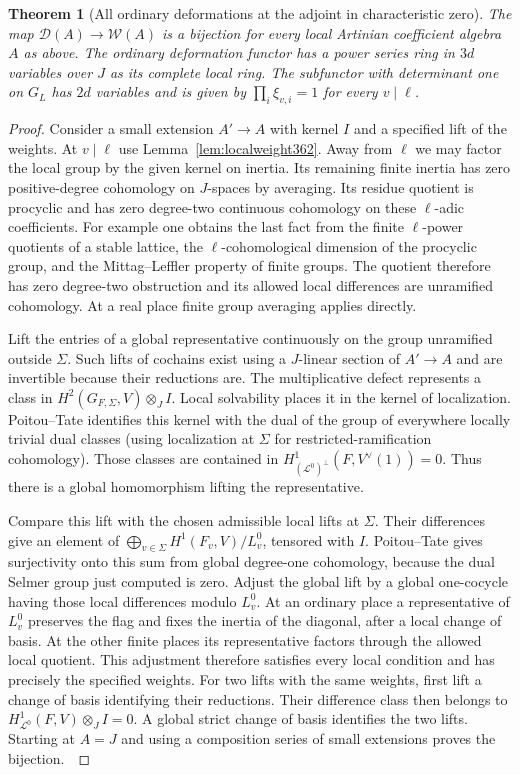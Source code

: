 \documentclass[a4paper,11pt]{article}
\newtheorem{theorem}[proposition]{Theorem}
\theoremstyle{definition}
\theoremstyle{remark}
\numberwithin{equation}{section}
\begin{document}
\begin{theorem}[All ordinary deformations at the adjoint in characteristic zero]
\label{thm:weightchart362}
The map \(\mathcal D(A)\to\mathcal W(A)\) is a bijection for
every local Artinian coefficient algebra \(A\) as above.
The ordinary deformation functor has a power series ring
in \(3d\) variables over \(J\) as its complete local ring.
The subfunctor with determinant one on \(G_L\) has \(2d\)
variables and is given by \(\prod_i\xi_{v,i}=1\) for every
\(v\mid\ell\).
\end{theorem}
\begin{proof}
Consider a small extension \(A'\to A\) with kernel \(I\) and a
specified lift of the weights. At \(v\mid\ell\) use
Lemma~\ref{lem:localweight362}. Away from \(\ell\) we may
factor the local group by the given kernel on inertia. Its
remaining finite inertia has zero positive-degree cohomology
on \(J\)-spaces by averaging. Its residue quotient is procyclic
and has zero degree-two continuous cohomology on these
\(\ell\)-adic coefficients. For example one obtains the last
fact from the finite \(\ell\)-power quotients of a stable
lattice, the \(\ell\)-cohomological dimension of the procyclic
group, and the Mittag--Leffler property of finite groups.
The quotient therefore has zero degree-two obstruction and
its allowed local differences are unramified cohomology.
At a real place finite group averaging applies directly.

Lift the entries of a global representative continuously on the
group unramified outside \(\Sigma\). Such lifts of cochains
exist using a \(J\)-linear section of \(A'\to A\) and are
invertible because their reductions are. The multiplicative defect represents
a class in \(H^2(G_{F,\Sigma},V)\otimes_J I\). Local solvability
places it in the kernel of localization. Poitou--Tate identifies
this kernel with the dual of the group of everywhere locally
trivial dual classes (using localization at \(\Sigma\) for
restricted-ramification cohomology). Those classes are
contained in \(H^1_{(\mathcal L^0)^\perp}(F,V^\vee(1))=0\).
Thus there is a global homomorphism lifting the representative.

Compare this lift with the chosen admissible local lifts at
\(\Sigma\). Their differences give an element of
\(\bigoplus_{v\in\Sigma}H^1(F_v,V)/L_v^0\), tensored with \(I\).
Poitou--Tate gives surjectivity onto this sum from global
degree-one cohomology, because the dual Selmer group just
computed is zero. Adjust the global lift by a global
one-cocycle having those local differences modulo \(L_v^0\).
At an ordinary place a representative of \(L_v^0\) preserves
the flag and fixes the inertia of the diagonal, after a local
change of basis. At the other finite places its representative
factors through the allowed local quotient. This adjustment
therefore satisfies every local condition and has precisely
the specified weights. For two lifts with the same weights,
first lift a change of basis identifying their reductions.
Their difference class then belongs to
\(H^1_{\mathcal L^0}(F,V)\otimes_J I=0\).
A global strict change of basis identifies the two lifts.
Starting at \(A=J\) and using a composition series of small
extensions proves the bijection.~\cite{VII-V-V-milne98}


\end{proof}
\end{document}
